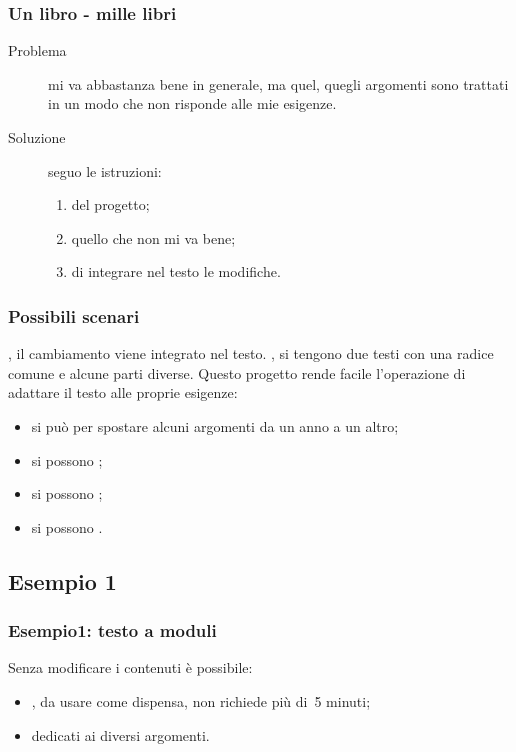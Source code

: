 \documentclass{beamer} %
\begin{document}
\begin{frame}\frametitle{Un libro - mille libri}

\begin{description}
\item [Problema ] mi va abbastanza bene in generale, ma quel, quegli 
argomenti sono trattati in un modo che non risponde alle mie esigenze.
\item [Soluzione ] seguo le istruzioni:
\begin{enumerate} [<+->]
\item {} del progetto;
\item {} quello che non mi va bene;
\item {} di integrare nel testo le modifiche.
\end{enumerate}
\end{description}

\end{frame}


\begin{frame}\frametitle{Possibili scenari}

, 
il cambiamento viene integrato nel testo.
\spause
{}, 
si tengono due testi con una radice comune e alcune parti diverse.
\spause
Questo progetto rende facile l'operazione di adattare il testo alle proprie 
esigenze:
\begin{itemize} %
\item si può  
per spostare alcuni argomenti da un anno a un altro;
\item si possono ;
\item si possono ;
\item si possono .
\end{itemize}

\end{frame}


\subsection{Esempio 1}


\begin{frame}\frametitle{Esempio1: testo a moduli}

Senza modificare i contenuti è possibile:
\begin{itemize} 
\item {}, da usare come dispensa, 
non richiede più di~5 minuti;
\item {} dedicati 
ai diversi argomenti.
\end{itemize}

\end{frame}
\end{document}
